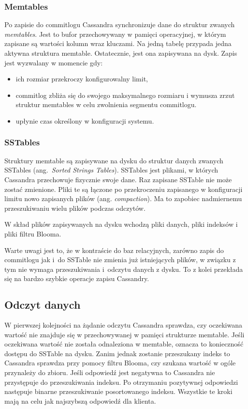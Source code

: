 \subsubsection{Memtables}

Po zapisie do commitlogu Cassandra synchronizuje dane do struktur zwanych \textit{memtables}.
Jest to bufor przechowywany w pamięci operacyjnej, w którym zapisane są wartości kolumn wraz kluczami.
Na jedną tabelę przypada jedna aktywna struktura memtable.
Ostatecznie, jest ona zapisywana na dysk.
Zapis jest wyzwalany w momencie gdy:
\begin{itemize}
    \item ich rozmiar przekroczy konfigurowalny limit,
    \item commitlog zbliża się do swojego maksymalnego rozmiaru i wymusza zrzut struktur memtables w celu zwolnienia segmentu commitlogu.
    \item upłynie czas określony w konfiguracji systemu.
\end{itemize}

\subsubsection{SSTables}

Struktury memtable są zapisywane na dysku do struktur danych zwanych SSTables (ang.~\textit{Sorted Strings Tables}).
SSTables jest plikami, w których Cassandra przechowuje fizycznie swoje dane.
Raz zapisane SSTable nie może zostać zmienione.
Pliki te są łączone po przekroczeniu zapisanego w konfiguracji limitu nowo zapisanych plików (ang. \textit{compaction}).
Ma to zapobiec nadmiernemu przeszukiwaniu wielu plików podczas odczytów.

W skład plików zapisywanych na dysku wchodzą pliki danych, pliki indeksów i pliki filtru Blooma.

Warte uwagi jest to, że w kontraście do baz relacyjnych, zarówno zapis do commitlogu jak i~do SSTable nie zmienia już istniejących plików, w związku z tym nie wymaga przeszukiwania i~odczytu danych z dysku.
To z kolei przekłada się na bardzo szybkie operacje zapisu Cassandry.

\subsection{Odczyt danych}

W pierwszej kolejności na żądanie odczytu Cassandra sprawdza, czy oczekiwana wartość nie znajduje się w przechowywanej w pamięci strukturze memtable.
Jeśli oczekiwana wartość nie została odnaleziona w memtable, oznacza to konieczność dostępu do SSTable na dysku.
Zanim jednak zostanie przeszukany indeks to Cassandra sprawdza przy pomocy filtru Blooma, czy szukana wartość w ogóle przynależy do zbioru. 
Jeśli odpowiedź jest negatywna to Cassandra nie przystępuje do przeszukiwania indeksu.
Po otrzymaniu pozytywnej odpowiedzi następuje binarne przeszukiwanie posortowanego indeksu.
Wszystkie te kroki mają na celu jak najszybszą odpowiedź dla klienta.

